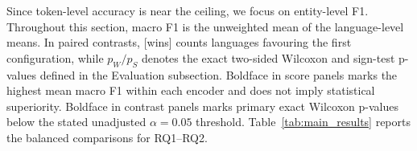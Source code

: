 \documentclass{article}
\begin{document}
Since token-level accuracy is near the ceiling, we focus on entity-level F1.
Throughout this section, macro F1 is the unweighted mean of the language-level means.
In paired contrasts, [wins] counts languages favouring the first configuration, while $p_W/p_S$ denotes the exact two-sided Wilcoxon and sign-test p-values defined in the Evaluation subsection.
Boldface in score panels marks the highest mean macro F1 within each encoder and does not imply statistical superiority.
Boldface in contrast panels marks primary exact Wilcoxon p-values below the stated unadjusted $\alpha=0.05$ threshold.
Table~\ref{tab:main_results} reports the balanced comparisons for RQ1--RQ2.
\begin{table}[H]
\centering
\caption{RQ1--RQ2 macro F1 and paired language-level contrasts for monolingual and balanced multilingual training. Panel (b) cells report $\Delta$F1 [wins] $p_W/p_S$.}
\label{tab:main_results}
\end{table}
\end{document}
